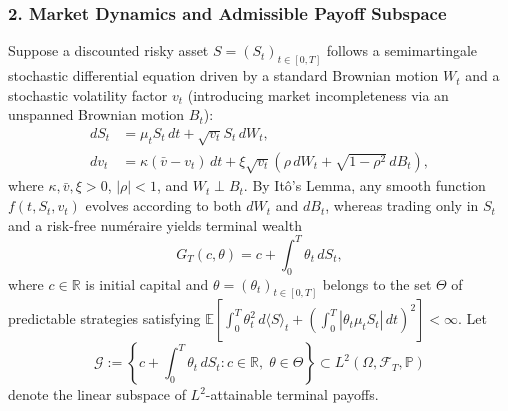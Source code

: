 \documentclass[11pt, letterpaper]{article}
\theoremstyle{definition}
\theoremstyle{remark}
\begin{document}
\subsubsection*{2. Market Dynamics and Admissible Payoff Subspace}
Suppose a discounted risky asset $S = (S_t)_{t \in [0, T]}$ follows a semimartingale stochastic differential equation driven by a standard Brownian motion $W_t$ and a stochastic volatility factor $v_t$ (introducing market incompleteness via an unspanned Brownian motion $B_t$):
\begin{align*}
    dS_t &= \mu_t S_t\,dt + \sqrt{v_t} S_t\,dW_t, \\
    dv_t &= \kappa(\bar{v} - v_t)\,dt + \xi \sqrt{v_t}\left(\rho\,dW_t + \sqrt{1 - \rho^2}\,dB_t\right),
\end{align*}
where $\kappa, \bar{v}, \xi > 0$, $|\rho| < 1$, and $W_t \perp B_t$. By It\^{o}'s Lemma, any smooth function $f(t, S_t, v_t)$ evolves according to both $dW_t$ and $dB_t$, whereas trading only in $S_t$ and a risk-free num\'{e}raire yields terminal wealth
\[
    G_T(c, \theta) = c + \int_0^T \theta_t\,dS_t,
\]
where $c \in \mathbb{R}$ is initial capital and $\theta = (\theta_t)_{t \in [0, T]}$ belongs to the set $\Theta$ of predictable strategies satisfying $\mathbb{E}\left[\int_0^T \theta_t^2\,d\langle S \rangle_t + \left(\int_0^T |\theta_t \mu_t S_t|\,dt\right)^2\right] < \infty$. Let
\[
    \mathcal{G} := \left\{ c + \int_0^T \theta_t\,dS_t : c \in \mathbb{R},\; \theta \in \Theta \right\} \subset L^2(\Omega, \mathcal{F}_T, \mathbb{P})
\]
denote the linear subspace of $L^2$-attainable terminal payoffs.
\end{document}
